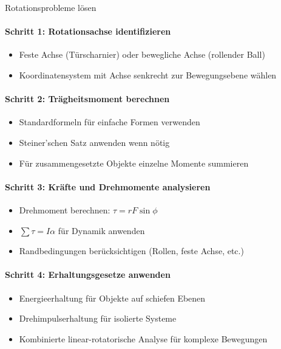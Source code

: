\begin{KR}{Rotationsprobleme lösen}\\
    \paragraph{Schritt 1: Rotationsachse identifizieren}
    \begin{itemize}
        \item Feste Achse (Türscharnier) oder bewegliche Achse (rollender Ball)
        \item Koordinatensystem mit Achse senkrecht zur Bewegungsebene wählen
    \end{itemize}
    
    \paragraph{Schritt 2: Trägheitsmoment berechnen}
    \begin{itemize}
        \item Standardformeln für einfache Formen verwenden
        \item Steiner'schen Satz anwenden wenn nötig
        \item Für zusammengesetzte Objekte einzelne Momente summieren
    \end{itemize}
    
    \paragraph{Schritt 3: Kräfte und Drehmomente analysieren}
    \begin{itemize}
        \item Drehmoment berechnen: $\tau = rF\sin\phi$
        \item $\sum \tau = I\alpha$ für Dynamik anwenden
        \item Randbedingungen berücksichtigen (Rollen, feste Achse, etc.)
    \end{itemize}
    
    \paragraph{Schritt 4: Erhaltungsgesetze anwenden}
    \begin{itemize}
        \item Energieerhaltung für Objekte auf schiefen Ebenen
        \item Drehimpulserhaltung für isolierte Systeme
        \item Kombinierte linear-rotatorische Analyse für komplexe Bewegungen
    \end{itemize}
\end{KR}

